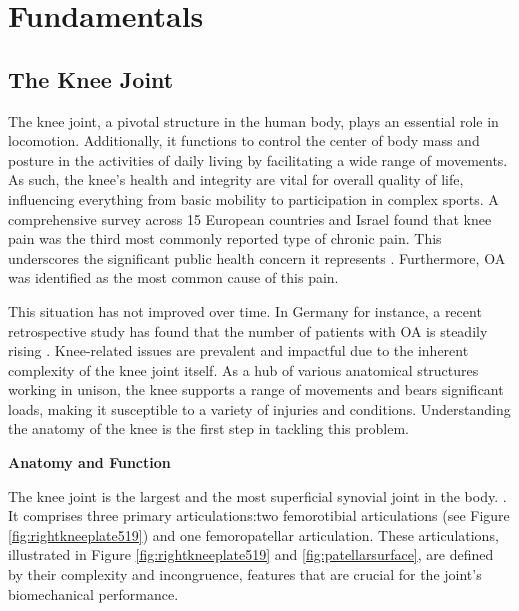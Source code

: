 \documentclass{micro-econ-thesis}
\begin{document}
\section{Fundamentals}
\label{sec:intro}


\subsection{The Knee Joint }
The knee joint, a pivotal structure in the human body, plays an essential role in locomotion. Additionally, it functions to control the center of body mass and posture in the activities of daily living by facilitating a wide range of movements. As such, the knee's health and integrity are vital for overall quality of life, influencing everything from basic mobility to participation in complex sports. A comprehensive survey across 15 European countries and Israel found that knee pain was the third most commonly reported type of chronic pain. This underscores the significant public health concern it represents \parencite{breivik_survey_2006}. Furthermore, OA was identified as the most common cause of this pain. 

This situation has not improved over time. In Germany for instance, a recent retrospective study has found that the number of patients with OA is steadily rising \parencite{obermuller_epidemiology_2024}. 
Knee-related issues are prevalent and impactful due to the inherent complexity of the knee joint itself. As a hub of various anatomical structures working in unison, the knee supports a range of movements and bears significant loads, making it susceptible to a variety of injuries and conditions.
Understanding the anatomy of the knee is the first step in tackling this problem. 

\textbf{Anatomy and Function}

The knee joint is the largest and the most superficial synovial joint in the body. \parencite{dalley_moores_2023}. 
It comprises three primary articulations:two femorotibial articulations (see Figure \ref{fig:rightkneeplate519}) and one femoropatellar articulation. These articulations, illustrated in Figure \ref{fig:rightkneeplate519} and \ref{fig:patellarsurface}, are defined by their complexity and incongruence, features that are crucial for the joint's biomechanical performance. 
 
\end{document}
